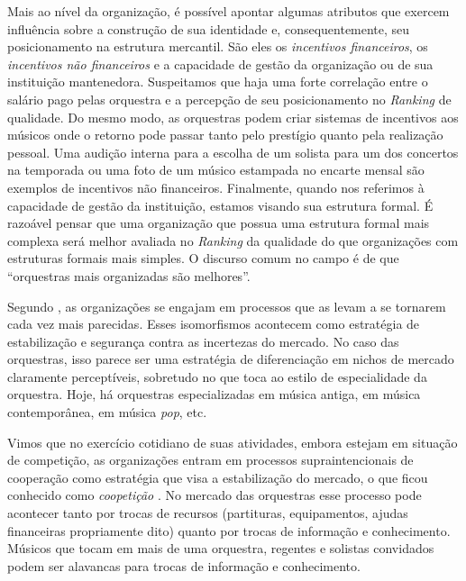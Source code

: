 \documentclass[a4paper, 12pt, openright, oneside, german, french, english, brazil]{abntex2}
\begin{document}
	Mais ao nível da organização, é possível apontar algumas atributos que exercem influência sobre a construção de sua identidade e, consequentemente, seu posicionamento na estrutura mercantil. São eles os \textit{incentivos financeiros}, os \textit{incentivos não financeiros} e a capacidade de gestão da organização ou de sua instituição mantenedora. Suspeitamos que haja uma forte correlação entre o salário pago pelas orquestra e a percepção de seu posicionamento no \textit{Ranking} de qualidade. Do mesmo modo, as orquestras podem criar sistemas de incentivos aos músicos onde o retorno pode passar tanto pelo prestígio quanto pela realização pessoal. Uma audição interna para a escolha de um solista para um dos concertos na temporada ou uma foto de um músico estampada no encarte mensal são exemplos de incentivos não financeiros. Finalmente, quando nos referimos à capacidade de gestão da instituição, estamos visando sua estrutura formal. É razoável pensar que uma organização que possua uma estrutura formal mais complexa será melhor avaliada no \textit{Ranking} da qualidade do que organizações com estruturas formais mais simples. O discurso comum no campo é de que ``orquestras mais organizadas são melhores''.

	Segundo , as organizações se engajam em processos que as levam a se tornarem cada vez mais parecidas. Esses isomorfismos acontecem como estratégia de estabilização e segurança contra as incertezas do mercado. No caso das orquestras, isso parece ser uma estratégia de diferenciação em nichos de mercado claramente perceptíveis, sobretudo no que toca ao estilo de especialidade da orquestra. Hoje, há orquestras especializadas em música antiga, em música contemporânea, em música \textit{pop}, etc.


	Vimos que no exercício cotidiano de suas atividades, embora estejam em situação de competição, as organizações entram em processos supraintencionais de cooperação como estratégia que visa a estabilização do mercado, o que ficou conhecido como \textit{coopetição} \cite{lazega2009theorie}. No mercado das orquestras esse processo pode acontecer tanto por trocas de recursos (partituras, equipamentos, ajudas financeiras propriamente dito) quanto por trocas de informação e conhecimento. Músicos que tocam em mais de uma orquestra, regentes e solistas convidados podem ser alavancas para trocas de informação e conhecimento.
\end{document}
